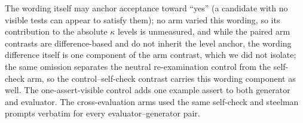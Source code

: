 \documentclass[a4paper,journal]{IAENGtran}
\begin{document}
The wording itself may anchor acceptance toward ``yes'' (a candidate with no visible
tests can appear to satisfy them); no arm varied this wording, so its contribution
to the absolute $\kappa$ levels is unmeasured, and while the paired arm contrasts
are difference-based and do not inherit the level anchor, the wording difference
itself is one component of the arm contrast, which we did not isolate; the same
omission separates the neutral re-examination control from the self-check arm,
so the control--self-check contrast carries this wording component as well. The
one-assert-visible control adds one example assert to both generator and
evaluator. The cross-evaluation arms used the same self-check and steelman
prompts verbatim for every evaluator--generator pair.



\end{document}
